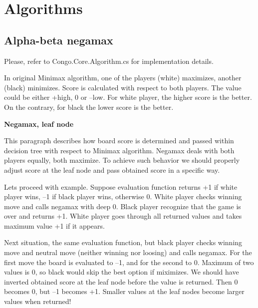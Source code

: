 \section{Algorithms}

\subsection{Alpha-beta negamax}

Please, refer to \textsf{Congo.Core.Algorithm.cs} for implementation details.

\vspace{0.5em}

In original Minimax algorithm, one of the players (white) maximizes, another
(black) minimizes. Score is calculated with respect to both players. The value
could be either +high, 0 or --low. For white player, the higher score is the
better. On the contrary, for black the lower score is the better.

\vspace{0.5em}

\textbf{Negamax, leaf node}

\vspace{0.5em}

This paragraph describes how board score is determined and passed within
decision tree with respect to Minimax algorithm. Negamax deals with both
players equally, both maximize. To achieve such behavior we should properly
adjust score at the leaf node and pass obtained score in a specific way.

\vspace{0.5em}

Lets proceed with example. Suppose evaluation function returns +1 if white
player wins, --1 if black player wins, otherwise 0. White player checks
winning move and calls negamax with deep 0. Black player recognize that the
game is over and returns +1. White player goes through all returned values and
takes maximum value +1 if it appears.

\vspace{0.5em}

Next situation, the same evaluation function, but black player checks winning
move and neutral move (neither winning nor loosing) and calls negamax. For the
first move the board is evaluated to --1, and for the second to 0. Maximum of
two values is 0, so black would skip the best option if miximizes. We should
have inverted obtained score at the leaf node before the value is returned.
Then 0 becomes 0, but --1 becomes +1. Smaller values at the leaf nodes become
larger values when returned!

